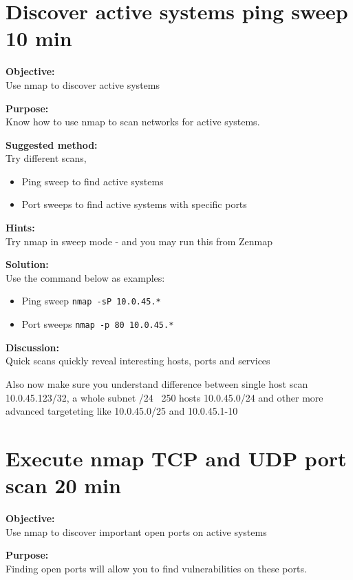 \documentclass[a4paper,11pt,notitlepage]{report}
\begin{document}
\chapter{Discover active systems ping sweep 10 min}
\label{ex:nmap-pingsweep}

{\bf Objective:}\\
Use nmap to discover active systems

{\bf Purpose:}\\
Know how to use nmap to scan networks for active systems.

{\bf Suggested method:}\\
Try different scans,
\begin{itemize}
\item Ping sweep to find active systems
\item Port sweeps to find active systems with specific ports
\end{itemize}

{\bf Hints:} \\
Try nmap in sweep mode - and you may run this from Zenmap

{\bf Solution:}\\
Use the command below as examples:
\begin{itemize}
\item Ping sweep \verb+nmap -sP 10.0.45.*+
\item Port sweeps \verb+nmap -p 80 10.0.45.*+
\end{itemize}

{\bf Discussion:}\\
Quick scans quickly reveal interesting hosts, ports and services

Also now make sure you understand difference between single host scan
10.0.45.123/32, a whole subnet /24 ~250 hosts 10.0.45.0/24 and other more advanced targeteting like 10.0.45.0/25 and 10.0.45.1-10


\chapter{Execute nmap TCP and UDP port scan 20 min}
\label{ex:nmap-synscan}


{\bf Objective:} \\
Use nmap to discover important open ports on active systems

{\bf Purpose:}\\
Finding open ports will allow you to find vulnerabilities on these ports.
\end{document}
